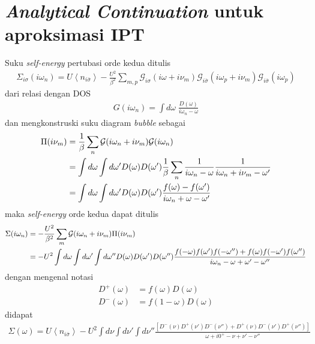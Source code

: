 
\chapter{\textit{Analytical Continuation} untuk aproksimasi IPT}

Suku \textit{self-energy} pertubasi orde kedua ditulis
\begin{align}
\Sigma_{i\sigma}(i\omega_n) = U\left< n_{i\bar{\sigma}} \right> - \frac{U^2}{\beta^2} \sum_{m,p} \mathcal{G}_{i\sigma}(i\omega + i\nu_m)\mathcal{G}_{i\bar{\sigma}}(i\omega_p + i\nu_m)\mathcal{G}_{i\bar{\sigma}}(i\omega_p)
\end{align}
dari relasi dengan DOS
\begin{align}
G(i\omega_n) = \int d\omega \; \frac{D(\omega)}{i\omega_n - \omega}
\end{align}
dan mengkonstruski suku diagram \textit{bubble} sebagai
\begin{align}
\Pi(i\nu_m) &= \frac{1}{\beta} \sum_n \mathcal{G}(i\omega_n + i\nu_m)\mathcal{G}(i\omega_n)\notag\\
&= \int d\omega \int d\omega' D(\omega)D(\omega') \frac{1}{\beta} \sum_n \frac{1}{i\omega_n - \omega}\frac{1}{i\omega_n + i\nu_m - \omega'}\notag\\
&= \int d\omega \int d\omega' D(\omega)D(\omega')\frac{f(\omega) - f(\omega')}{i\omega_n + \omega - \omega'}
\end{align}
maka \textit{self-energy} orde kedua dapat ditulis
\begin{align}
\Sigma(i\omega_n) &= -\frac{U^2}{\beta^2}\sum_m \mathcal{G}(i\omega_n + i\nu_m)\Pi(i\nu_m)\notag\\
&= -U^2 \int d\omega \int d\omega' \int d\omega'' D(\omega)D(\omega')D(\omega'') \frac{f(-\omega)f(\omega')f(-\omega'') + f(\omega)f(-\omega')f(\omega'')}{i\omega_n - \omega + \omega' - \omega''}
\end{align}
dengan mengenal notasi
\begin{align}
D^+(\omega) &= f(\omega)D(\omega)\\
D^-(\omega) &= f(1 - \omega)D(\omega)
\end{align}
didapat
\begin{align}
\Sigma(\omega) = U\left< n_{i\bar{\sigma}} \right> - U^2 \int d\nu \int d\nu' \int d\nu'' \frac{[D^-(\nu)D^+(\nu')D^-(\nu'') + D^+(\nu)D^-(\nu')D^+(\nu'')]}{\omega + i0^+ - \nu + \nu' - \nu''}
\end{align}